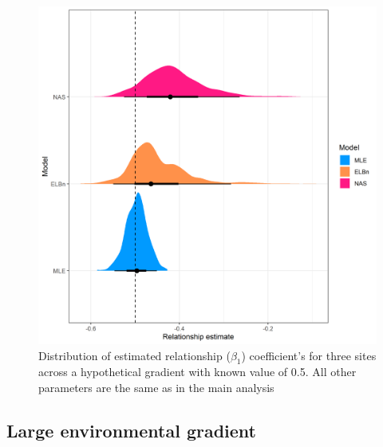 \documentclass[
]{article}
\begin{document}
\newpage

\begin{figure}
\centering
\includegraphics{figures/PLB_3_sites_relationship_density.png}
\caption{Distribution of estimated relationship (\(\beta_1\))
coefficient's for three sites across a hypothetical gradient with known
value of 0.5. All other parameters are the same as in the main analysis}
\end{figure}

\newpage

\hypertarget{large-environmental-gradient}{%
\subsection{Large environmental
gradient}\label{large-environmental-gradient}}
\end{document}
